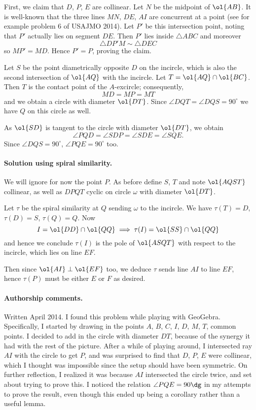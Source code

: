 \documentclass[11pt]{scrartcl}
\begin{document}
First, we claim that $D$, $P$, $E$ are collinear.
Let $N$ be the midpoint of $\ol{AB}$.
It is well-known that the three lines $MN$, $DE$, $AI$ are concurrent at a point
(see for example problem 6 of USAJMO 2014).
Let $P'$ be this intersection point, noting that $P'$ actually lies on segment $DE$.
Then $P'$ lies inside $\triangle ABC$ and moreover
\[ \triangle DP'M \sim \triangle DEC \]
so $MP' = MD$.
Hence $P'=P$, proving the claim.

Let $S$ be the point diametrically opposite $D$ on the incircle,
which is also the second intersection of $\ol{AQ}$ with the incircle.
Let $T = \ol{AQ} \cap \ol{BC}$.
Then $T$ is the contact point of the $A$-excircle;
consequently, \[ MD = MP = MT \] and we obtain a circle with diameter $\ol{DT}$.
Since $\angle DQT = \angle DQS = 90^{\circ}$ we have $Q$ on this circle as well.

As $\ol{SD}$ is tangent to the circle with diameter $\ol{DT}$,
we obtain \[ \angle PQD = \angle SDP = \angle SDE = \angle SQE. \]
Since $\angle DQS = 90^{\circ}$, $\angle PQE = 90^{\circ}$ too.

\paragraph{Solution using spiral similarity.}
We will ignore for now the point $P$.
As before define $S$, $T$ and note $\ol{AQST}$ collinear,
as well as $DPQT$ cyclic on circle $\omega$ with diameter $\ol{DT}$.

Let $\tau$ be the spiral similarity at $Q$
sending $\omega$ to the incircle.
We have $\tau(T) = D$, $\tau(D) = S$, $\tau(Q) = Q$.
Now
\[ I = \ol{DD} \cap \ol{QQ} \implies
\tau(I) = \ol{SS} \cap \ol{QQ} \]
and hence we conclude $\tau(I)$ is the pole of $\ol{ASQT}$
with respect to the incircle, which lies on line $EF$.

Then since $\ol{AI} \perp \ol{EF}$ too,
we deduce $\tau$ sends line $AI$ to line $EF$,
hence $\tau(P)$ must be either $E$ or $F$ as desired.

\paragraph{Authorship comments.}
Written April 2014.
I found this problem while playing with GeoGebra.
Specifically, I started by drawing in the points $A$, $B$, $C$,
$I$, $D$, $M$, $T$, common points.
I decided to add in the circle with diameter $DT$,
because of the synergy it had with the rest of the picture.
After a while of playing around,
I intersected ray $AI$ with the circle to get $P$,
and was surprised to find that $D$, $P$, $E$ were collinear,
which I thought was impossible since the setup should have been symmetric.
On further reflection, I realized it was because $AI$
intersected the circle twice, and set about trying to prove this.
I noticed the relation $\angle PQE = 90\dg$ in my attempts
to prove the result, even though this ended up being a corollary
rather than a useful lemma.
\pagebreak
\end{document}
